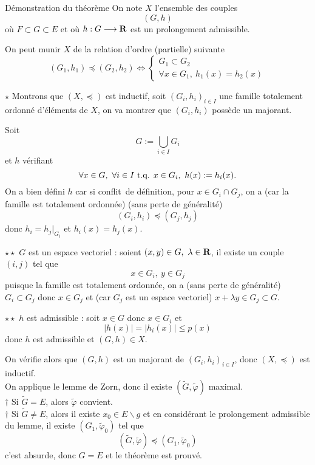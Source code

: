\documentclass[a4paper,11pt, twoside]{article}
\begin{document}
\begin{ProofC}{Démonstration du théorème}
  On note $X$ l'ensemble des couples
  $$(G,h)$$
  où $F\subset G\subset E$ et où $h:G\longrightarrow \mathbf R$ est un prolongement admissible.

  On peut munir $X$ de la relation d'ordre (partielle) suivante 
  $$(G_1,h_1)\preccurlyeq(G_2,h_2)\Leftrightarrow\begin{cases}
    G_1\subset G_2\\
    \forall x\in G_1,\ h_1(x)=h_2(x)
  \end{cases}$$

  $\star$ Montrons que $(X,\preccurlyeq)$ est inductif, soit $(G_i,h_i)_{i\in I}$ une famille totalement ordonné d'éléments de $X$, on va montrer que $(G_i,h_i)$ possède un majorant.

  Soit 
  $$G:=\bigcup_{i\in I}G_i$$
  et $h$ vérifiant 
  $$\forall x\in G,\ \forall i\in I\text{ t.q. } x\in G_i,\ h(x):=h_i(x).$$
  On a bien défini $h$ car si \og conflit\fg\ de définition, pour $x\in G_i\cap G_j$, on a (car la famille est totalement ordonnée) (sans perte de généralité)
  $$(G_i,h_i)\preccurlyeq(G_j,h_j)$$
  donc $h_i=h_j\big|_{G_i}$ et $h_i(x)=h_j(x).$

  $\star\star$ $G$ est un espace vectoriel : soient $(x,y)\in G,\ \lambda\in \R$, il existe un couple $(i,j)$ tel que 
  $$x\in G_i,\ y\in G_j$$
  puisque la famille est totalement ordonnée, on a (sans perte de généralité) $G_i\subset G_j$ donc $x\in G_j$ et (car $G_j$ est un espace vectoriel) $x+\lambda y\in G_j\subset G.$

  $\star\star$ $h$ est admissible : soit $x\in G$ donc $x\in G_i$ et 
  $$|h(x)|=|h_i(x)|\leqslant p(x)$$
  donc $h$ est admissible et $(G,h)\in X$.

  On vérifie alors que $(G,h)$ est un majorant de $(G_i,h_i)_{i\in I}$, donc $(X,\preccurlyeq)$ est inductif.\\

  On applique le lemme de Zorn, donc il existe $(\tilde G,\tilde\varphi)$ maximal.\\

  $\dagger$ Si $\tilde G=E$, alors $\tilde\varphi$ convient.\\

  $\dagger$ Si $\tilde G\neq E$, alors il existe $x_0\in E\backslash g$ et en considérant le prolongement admissible du lemme, il existe $(G_1, \tilde\varphi_0)$ tel que 
  $$(\tilde G,\tilde\varphi)\preccurlyeq(G_1, \tilde\varphi_0)$$
  c'est absurde, donc $G=E$ et le théorème est prouvé.
\end{ProofC}
\end{document}
